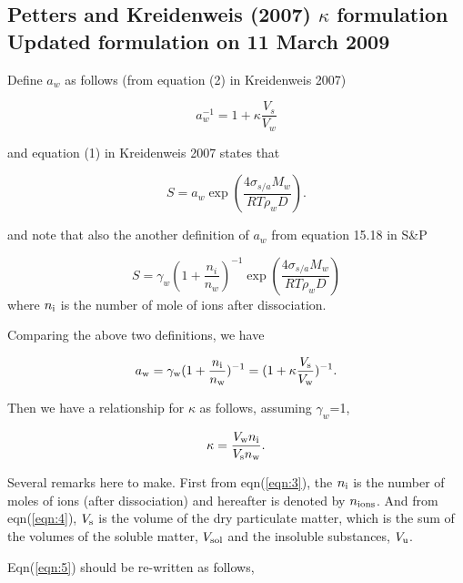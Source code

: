\documentclass[12pt]{article}
\begin{document}

\subsection{Petters and Kreidenweis (2007) $\kappa$ formulation Updated formulation on 11 March 2009}

Define $a_{w}$ as follows (from equation (2) in Kreidenweis 2007)

\begin{equation}\label{eqn:1}
a_{w}^{-1}=1+\kappa \frac{V_s}{V_w}
\end{equation}

and equation (1) in Kreidenweis 2007 states that

\begin{equation}\label{eqn:2}
S=a_{w} \exp (\frac{4 \sigma_{s/a} M_{w}} {RT\rho_wD}).
\end{equation}

and note that also the another definition of $a_{w}$ from equation 15.18 in S\&P

\begin{equation}\label{eqn:3}
S=\gamma_{w}(1+ \frac{n_{i}}{n_{w}})^{-1}\exp (\frac{4 \sigma_{s/a} M_{w}} {RT\rho_wD})
\end{equation}
where $n_{\rm i}$ is the number of mole of ions after dissociation.

Comparing the above two definitions, we have


\begin{equation}\label{eqn:4}
a_{\rm w}=\gamma _{\rm w}(1+\frac{n_{\rm i}}{n_{\rm w}})^{-1}=(1+\kappa \frac{V_{\rm s}}{V_{\rm w}})^{-1}.
\end{equation}

Then we have a relationship for $\kappa$ as follows, assuming $\gamma_{w}$=1, 

\begin{equation}\label{eqn:5}
\kappa= \frac{V_{\rm w} n_{\rm i}}{V_{\rm s} n_{\rm w}}.
\end{equation}

Several remarks here to make. First from eqn(\ref{eqn:3}), the $n_{\rm i}$ is the number of moles of ions (after dissociation) and hereafter is denoted by $n_{\rm ions}$. 
And from eqn(\ref{eqn:4}), $V_{\rm s}$ is the volume of the dry particulate matter, which is the sum of the volumes of the soluble matter, $V_{\rm sol}$ and the insoluble substances, $V_{\rm u}$.

Eqn(\ref{eqn:5}) should be re-written as follows,
 
\end{document}
